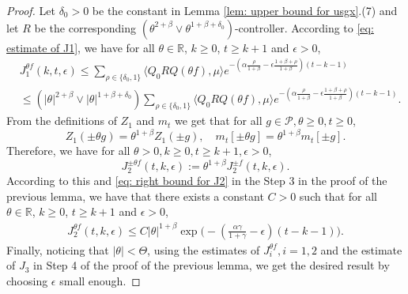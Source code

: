 \documentclass[12pt,a4paper]{amsart}
\theoremstyle{plain}
\theoremstyle{definition}
\numberwithin{equation}{section}
\begin{document}
\begin{proof}
    Let $\delta_0 >0$ be the constant in Lemma \ref{lem: upper bound for usgx}.(7) and let $R$ be the corresponding $(\theta^{2+\beta}\vee \theta^{1+\beta+\delta_0})$-controller.
	According to \eqref{eq: estimate of J1}, we have for all $\theta\in \mathbb R$, $k\geq 0$, $t\geq k+1$ and $\epsilon> 0$,
\begin{equation}\begin{split}
	&J^{\theta f}_1(k,t,\epsilon)
     \leq \sum_{\rho \in \{\delta_0,1\}} \langle Q_0 RQ(\theta f), \mu \rangle e^{-(\alpha\frac{\rho}{1+\beta}-\epsilon\frac{1+\beta+\rho}{1+\beta})(t-k-1)}
     \\& \leq(|\theta|^{2+\beta}\vee |\theta|^{1+\beta+\delta_0}) \sum_{\rho \in \{\delta_0,1\}} \langle Q_0 RQ(\theta f), \mu \rangle e^{-(\alpha\frac{\rho}{1+\beta}-\epsilon\frac{1+\beta+\rho}{1+\beta})(t-k-1)}.
\end{split}\end{equation}
	From the definitions of $Z_1$ and $m_t$ we get that for all $g\in \mathcal P, \theta \geq 0, t\geq 0$,
\[
	Z_1( \pm \theta g) = \theta^{1+\beta} Z_1(\pm g), \quad m_t[\pm \theta g] = \theta^{1+\beta} m_t[\pm g].
\]
	Therefore, we have for all $\theta >0, k \geq 0, t\geq k+1, \epsilon > 0$,
\[
J^{\pm \theta f}_2(t,k,\epsilon)
	:= \theta^{1+\beta} J_2^{\pm f}(t,k,\epsilon).
\]
	According to this and \eqref{eq: right bound for J2} in the Step 3 in the proof of the previous lemma, we have that there exists a constant $C > 0$ such that for all $\theta\in \mathbb R$, $k\geq 0$, $t\geq k+1$ and $\epsilon> 0$,
\begin{equation}\begin{split}
\label{eq:31step3b}
    J^{\theta f}_2(t,k,\epsilon)
    \leq C |\theta|^{1+\beta}\exp\Big(-(\frac{\alpha\gamma}{1+\gamma}-\epsilon)(t-k-1)\Big).
\end{split}\end{equation}
	Finally, noticing that $|\theta| < \Theta$, using the estimates of $J^{\theta f}_{i}, i = 1,2$ and the estimate of $J_3$ in Step 4 of the proof of the previous lemma, we get the desired result by choosing $\epsilon$ small enough.
\end{proof}
\end{document}
